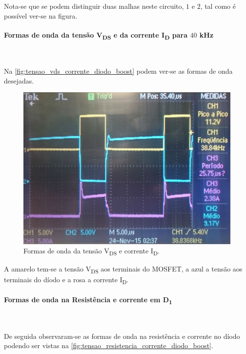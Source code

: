 \documentclass[a4paper,11pt]{article}
\numberwithin{equation}{section}
\begin{document}
Nota-se que se podem distinguir duas malhas neste circuito, $1$ e $2$, tal como é possível ver-se na figura.

\paragraph{Formas de onda da tensão V\textsubscript{DS} e da corrente I\textsubscript{D} para $40$ kHz}\mbox{}\

Na \autoref{fig:tensao_vds_corrente_diodo_boost} podem ver-se as formas de onda desejadas.

\begin{figure}[H]
	\centering
	\includegraphics[keepaspectratio=true, scale=0.14]{img/figs/tensao_vds_corrente_diodo_boost}
	\caption{Formas de onda da tensão V\textsubscript{DS} e corrente I\textsubscript{D}.}
	\label{fig:tensao_vds_corrente_diodo_boost}
	\vspace{-0.8em}
\end{figure}

A amarelo tem-se a tensão V\textsubscript{DS} aos terminais do MOSFET, a azul a tensão aos terminais do díodo e a rosa a corrente I\textsubscript{D}.

\paragraph{Formas de onda na Resistência e corrente em D\textsubscript{1}}\mbox{}\

De seguida observaram-se as formas de onda na resistência e corrente no díodo podendo ser vistas na \autoref{fig:tensao_resistencia_corrente_diodo_boost}.
\end{document}
